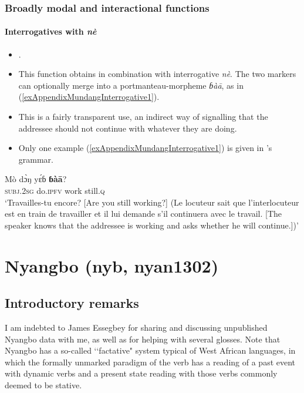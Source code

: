 \subsubsection{Broadly modal and interactional functions}
\paragraph{Interrogatives with \textit{nè}}\label{appendixMundangInterrogative}
\begin{itemize}
	\item \textcite[484–485]{Elders2000}.
	\item This function obtains in combination with interrogative \textit{nè}. The two markers can optionally merge into a portmanteau-morpheme \textit{ɓàā}, as in (\ref{exAppendixMundangInterrogative1}).
	\item This is a  fairly transparent use, an indirect way of signalling that the addressee should not continue with whatever they are doing.
	\item Only one example (\ref{exAppendixMundangInterrogative1}) is given in \citeauthor{Elders2000}'s grammar.
\end{itemize}
\begin{exe}
	\ex \label{exAppendixMundangInterrogative1}
	\gll Mò dɔ̀ŋ yɛ́ɓ \textbf{ɓàā}?\\
	\textsc{subj}.2\textsc{sg} do.\textsc{ipfv} work still.\textsc{q}\\
	\glt \lq Travailles-tu encore? [Are you still working?] (Le locuteur sait que l’interlocuteur est en train de travailler et il lui demande s’il continuera avec le travail. [The speaker knows that the addressee is working and asks whether he will continue.])' \parencite[485]{Elders2000}
\end{exe}

\section{Nyangbo (nyb, nyan1302)}\label{appendixNyangbo}
\subsection{Introductory remarks}
\begin{sloppypar}
I am indebted to James Essegbey for sharing and discussing unpublished Nyangbo data with me, as well as for helping with several glosses. Note that Nyangbo has a so-called \lq\lq factative" system typical of West African languages, in which the formally unmarked paradigm of the verb has a reading of a past event with dynamic verbs and a present state reading with those verbs commonly deemed to be stative. 
\end{sloppypar}

